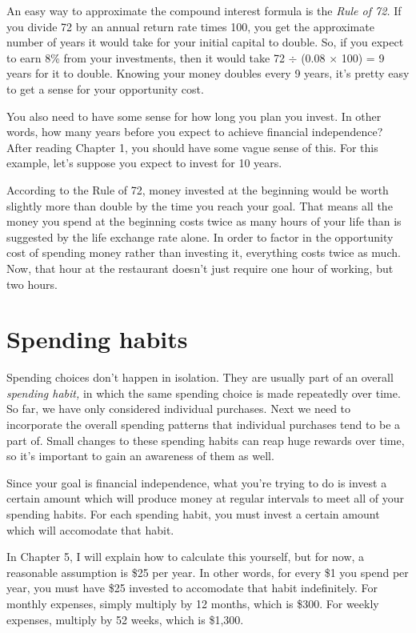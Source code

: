 An easy way to approximate the compound interest formula is the \emph{Rule of 72.} If you divide 72 by an annual return rate times 100, you get the approximate number of years it would take for your initial capital to double. So, if you expect to earn 8\% from your investments, then it would take 72 $\div$ (0.08 $\times$ 100) = 9 years for it to double. Knowing your money doubles every 9 years, it's pretty easy to get a sense for your opportunity cost.

You also need to have some sense for how long you plan you invest. In other words, how many years before you expect to achieve financial independence? After reading Chapter 1, you should have some vague sense of this. For this example, let's suppose you expect to invest for 10 years.

According to the Rule of 72, money invested at the beginning would be worth slightly more than double by the time you reach your goal. That means all the money you spend at the beginning costs twice as many hours of your life than is suggested by the life exchange rate alone. In order to factor in the opportunity cost of spending money rather than investing it, everything costs twice as much. Now, that hour at the restaurant doesn't just require one hour of working, but two hours.

\section{Spending habits}
Spending choices don't happen in isolation. They are usually part of an overall \emph{spending habit,} in which the same spending choice is made repeatedly over time. So far, we have only considered individual purchases. Next we need to incorporate the overall spending patterns that individual purchases tend to be a part of. Small changes to these spending habits can reap huge rewards over time, so it's important to gain an awareness of them as well.

Since your goal is financial independence, what you're trying to do is invest a certain amount which will produce money at regular intervals to meet all of your spending habits. For each spending habit, you must invest a certain amount which will accomodate that habit.

In Chapter 5, I will explain how to calculate this yourself, but for now, a reasonable assumption is \$25 per year. In other words, for every \$1 you spend per year, you must have \$25 invested to accomodate that habit indefinitely. For monthly expenses, simply multiply by 12 months, which is \$300. For weekly expenses, multiply by 52 weeks, which is \$1,300.

